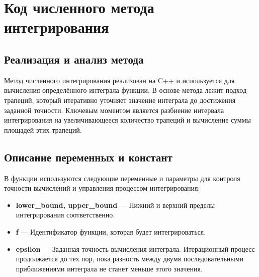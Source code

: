 \newpage
\section{Код численного метода интегрирования}

\subsection{Реализация и анализ метода}
Метод численного интегрирования реализован на C++ и используется для вычисления определённого интеграла функции. В основе метода лежит подход трапеций, который итеративно уточняет значение интеграла до достижения заданной точности. Ключевым моментом является разбиение интервала интегрирования на увеличивающееся количество трапеций и вычисление суммы площадей этих трапеций.

\subsection{Описание переменных и констант}
В функции используются следующие переменные и параметры для контроля точности вычислений и управления процессом интегрирования:

\begin{itemize}
    \item \textbf{lower\_bound, upper\_bound} — Нижний и верхний пределы интегрирования соответственно.
    \item \textbf{f} — Идентификатор функции, которая будет интегрироваться.
    \item \textbf{epsilon} — Заданная точность вычисления интеграла. Итерационный процесс продолжается до тех пор, пока разность между двумя последовательными приближениями интеграла не станет меньше этого значения.
\end{itemize}

